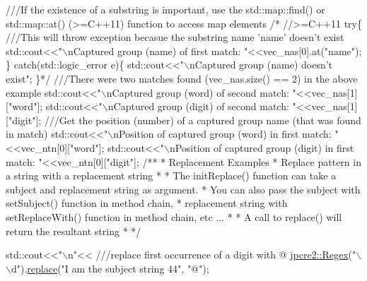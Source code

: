 \begin{DoxyCode}
\textcolor{comment}{}
\textcolor{comment}{///If the existence of a substring is important, use the std::map::find() or std::map::at() (>=C++11)
       function to access map elements}
\textcolor{comment}{}\textcolor{comment}{/* //>=C++11}
\textcolor{comment}{try\{}\textcolor{comment}{}
\textcolor{comment}{    ///This will throw exception becasue the substring name 'name' doesn't exist}
\textcolor{comment}{}    std::cout<<"\(\backslash\)nCaptured group (name) of first match: "<<vec\_nas[0].at("name");
\} catch(std::logic\_error e)\{
    std::cout<<"\(\backslash\)nCaptured group (name) doesn't exist";
\}*/
\textcolor{comment}{}
\textcolor{comment}{///There were two matches found (vec\_nas.size() == 2) in the above example}
\textcolor{comment}{}std::cout<<\textcolor{stringliteral}{"\(\backslash\)nCaptured group (word) of second match: "}<<vec\_nas[1][\textcolor{stringliteral}{"word"}];
std::cout<<\textcolor{stringliteral}{"\(\backslash\)nCaptured group (digit) of second match: "}<<vec\_nas[1][\textcolor{stringliteral}{"digit"}];
\textcolor{comment}{}
\textcolor{comment}{///Get the position (number) of a captured group name (that was found in match)}
\textcolor{comment}{}std::cout<<\textcolor{stringliteral}{"\(\backslash\)nPosition of captured group (word) in first match: "}<<vec\_ntn[0][\textcolor{stringliteral}{"word"}];
std::cout<<\textcolor{stringliteral}{"\(\backslash\)nPosition of captured group (digit) in first match: "}<<vec\_ntn[0][\textcolor{stringliteral}{"digit"}];
\textcolor{comment}{}
\textcolor{comment}{/**}
\textcolor{comment}{ * Replacement Examples}
\textcolor{comment}{ * Replace pattern in a string with a replacement string}
\textcolor{comment}{ * }
\textcolor{comment}{ * The initReplace() function can take a subject and replacement string as argument.}
\textcolor{comment}{ * You can also pass the subject with setSubject() function in method chain,}
\textcolor{comment}{ * replacement string with setReplaceWith() function in method chain, etc ...}
\textcolor{comment}{ * }
\textcolor{comment}{ * A call to replace() will return the resultant string}
\textcolor{comment}{ * */}

std::cout<<\textcolor{stringliteral}{"\(\backslash\)n"}<<\textcolor{comment}{}
\textcolor{comment}{///replace first occurrence of a digit with @}
\textcolor{comment}{}\hyperlink{classjpcre2_1_1Regex}{jpcre2::Regex}(\textcolor{stringliteral}{"\(\backslash\)\(\backslash\)d"}).\hyperlink{classjpcre2_1_1Regex_ac592ce7a5e4210ed5f90a0105b1f2981}{replace}(\textcolor{stringliteral}{"I am the subject string 44"}, \textcolor{stringliteral}{"@"});


\end{DoxyCode}
